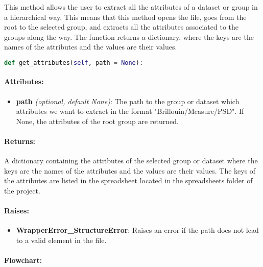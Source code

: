 This method allows the user to extract all the attributes of a dataset or group in a hierarchical way. This means that this method opens the file, goes from the root to the selected group, and extracts all the attributes associated to the groups along the way. The function returns a dictionary, where the keys are the names of the attributes and the values are their values.


\begin{lstlisting}[language=Python]
def get_attributes(self, path = None):
\end{lstlisting}

\paragraph{Attributes:}

\begin{itemize}
    \item \textbf{path} \textit{(optional, default None)}: The path to the group or dataset which attributes we want to extract in the format "Brillouin/Measure/PSD". If None, the attributes of the root group are returned.
\end{itemize}

\paragraph{Returns:} A dictionary containing the attributes of the selected group or dataset where the keys are the names of the attributes and the values are their values. The keys of the attributes are listed in the spreadsheet located in the spreadsheets folder of the project.

\paragraph{Raises:}

\begin{itemize}
    \item \textbf{WrapperError\_StructureError}: Raises an error if the path does not lead to a valid element in the file.
\end{itemize}

\paragraph{Flowchart:}

